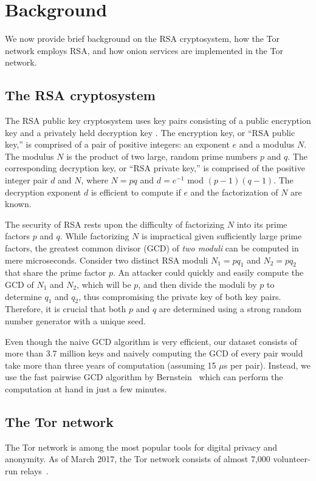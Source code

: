 \section{Background}
\label{sec:background}
We now provide brief background on the RSA cryptosystem, how the Tor
network employs RSA, and how onion services are implemented in the Tor network.

\subsection{The RSA cryptosystem}
The RSA public key cryptosystem uses key pairs consisting of a public encryption
key and a privately held decryption key \cite{Rivest1978a}. The encryption key,
or ``RSA public key,'' is comprised of a pair of positive integers: an exponent
$e$ and a modulus $N$. The modulus $N$ is the product of two large, random prime
numbers $p$ and $q$. The corresponding decryption key, or ``RSA private key,''
is comprised of the positive integer pair $d$ and $N$, where $N = pq$ and $d =
e^{-1}$ mod $(p - 1)(q - 1)$.  The decryption exponent $d$ is efficient to
compute if $e$ and the factorization of $N$ are known.

The security of RSA rests upon the difficulty of factorizing $N$ into its prime
factors $p$ and $q$.  While factorizing $N$ is impractical given sufficiently
large prime factors, the greatest common divisor (GCD) of \emph{two moduli} can
be computed in mere microseconds.  Consider two distinct RSA moduli $N_1 = pq_1$
and $N_2 = pq_2$ that share the prime factor $p$.  An attacker could quickly and
easily compute the GCD of $N_1$ and $N_2$, which will be $p$, and then divide the
moduli by $p$ to determine $q_1$ and $q_2$, thus compromising the private key of
both key pairs.  Therefore, it is crucial that both $p$ and $q$ are determined
using a strong random number generator with a unique seed.

Even though the naive GCD algorithm is very efficient, our dataset consists of
more than 3.7 million keys and naively computing the GCD of every pair would
take more than three years of computation (assuming 15 $\mu$s per pair).
Instead, we use the fast pairwise GCD algorithm by Bernstein~\cite{Bernstein04}
which can perform the computation at hand in just a few minutes.

\subsection{The Tor network}
\label{sec:tor-network}
The Tor network is among the most popular tools for digital privacy and
anonymity. As of March 2017, the Tor network consists of almost 7,000
volunteer-run relays~\cite{tormetrics}.

